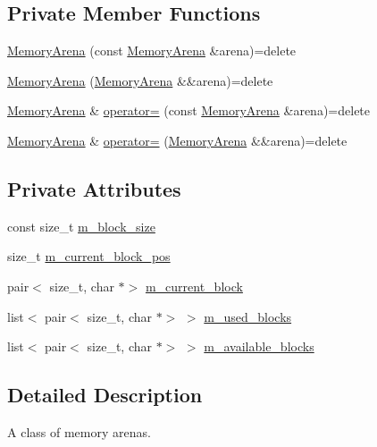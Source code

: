 \subsection*{Private Member Functions}
\begin{DoxyCompactItemize}
\item 
\hyperlink{classmage_1_1_memory_arena_a1eca6fdacbd1226f4b21f443d118168b}{Memory\+Arena} (const \hyperlink{classmage_1_1_memory_arena}{Memory\+Arena} \&arena)=delete
\item 
\hyperlink{classmage_1_1_memory_arena_a729e5745729e3e59f81fd05125d3cf37}{Memory\+Arena} (\hyperlink{classmage_1_1_memory_arena}{Memory\+Arena} \&\&arena)=delete
\item 
\hyperlink{classmage_1_1_memory_arena}{Memory\+Arena} \& \hyperlink{classmage_1_1_memory_arena_a7e7799f859c55435714933972ecb8b95}{operator=} (const \hyperlink{classmage_1_1_memory_arena}{Memory\+Arena} \&arena)=delete
\item 
\hyperlink{classmage_1_1_memory_arena}{Memory\+Arena} \& \hyperlink{classmage_1_1_memory_arena_aa4b80a917a838a1ca3788f906723d273}{operator=} (\hyperlink{classmage_1_1_memory_arena}{Memory\+Arena} \&\&arena)=delete
\end{DoxyCompactItemize}
\subsection*{Private Attributes}
\begin{DoxyCompactItemize}
\item 
const size\+\_\+t \hyperlink{classmage_1_1_memory_arena_a18177c245b045c5536330ffed284ed4d}{m\+\_\+block\+\_\+size}
\item 
size\+\_\+t \hyperlink{classmage_1_1_memory_arena_a880d07eb372ce1c8b907947fcbdfc59c}{m\+\_\+current\+\_\+block\+\_\+pos}
\item 
pair$<$ size\+\_\+t, char $\ast$$>$ \hyperlink{classmage_1_1_memory_arena_ab2d39233b1e64239baea519a2d073b04}{m\+\_\+current\+\_\+block}
\item 
list$<$ pair$<$ size\+\_\+t, char $\ast$$>$ $>$ \hyperlink{classmage_1_1_memory_arena_a9fc33bafde45afe06d05732572f415d1}{m\+\_\+used\+\_\+blocks}
\item 
list$<$ pair$<$ size\+\_\+t, char $\ast$$>$ $>$ \hyperlink{classmage_1_1_memory_arena_a89c4f1d2b4d5e05bb46fa303d70428c4}{m\+\_\+available\+\_\+blocks}
\end{DoxyCompactItemize}


\subsection{Detailed Description}
A class of memory arena\textquotesingle{}s. 

